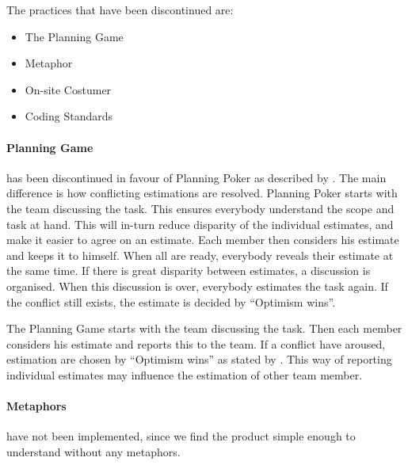 The practices that have been discontinued are:
\begin{itemize}
\item The Planning Game
\item Metaphor
\item On-site Costumer
\item Coding Standards
\end{itemize}

\paragraph{Planning Game} has been discontinued in favour of Planning Poker as described by \citet{xp:planningPoker}.
The main difference is how conflicting estimations are resolved.
Planning Poker starts with the team discussing the task. This ensures everybody understand the scope and task at hand. This will in-turn reduce disparity of the individual estimates, and make it easier to agree on an estimate. Each member then considers his estimate and keeps it to himself. When all are ready, everybody reveals their estimate at the same time. If there is great disparity between estimates, a discussion is organised. When this discussion is over, everybody estimates the task again. If the conflict still exists, the estimate is decided by ``Optimism wins''.

The Planning Game starts with the team discussing the task. Then each member considers his estimate and reports this to the team. If a conflict have aroused, estimation are chosen by ``Optimism wins'' as stated by \citet[p. 58]{xp:planning}.
This way of reporting individual estimates may influence the estimation of other team member. 
 

\paragraph{Metaphors} have not been implemented, since we find the product simple enough to understand without any metaphors.

